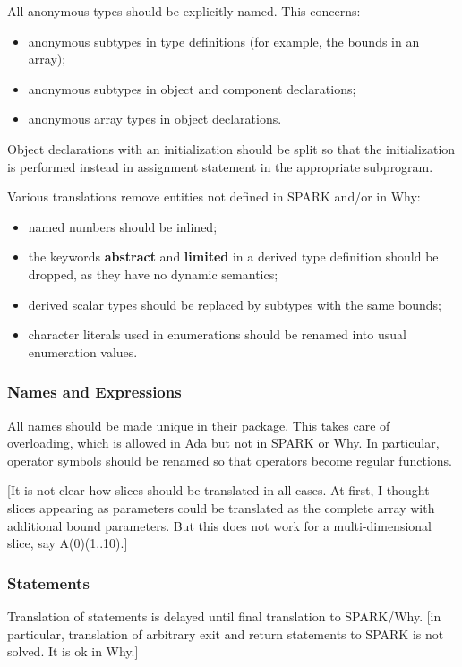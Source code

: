 \documentclass[fullpage]{article}
\newcounter{example}
\newcommand{\kw}[1]{\textbf{#1}}
\begin{document}
All anonymous types should be explicitly named. This concerns:
\begin{itemize}
\item anonymous subtypes in type definitions (for example, the bounds in an
  array);
\item anonymous subtypes in object and component declarations;
\item anonymous array types in object declarations.
\end{itemize}

Object declarations with an initialization should be split so that the
initialization is performed instead in assignment statement in the appropriate
subprogram.

Various translations remove entities not defined in SPARK and/or in Why:
\begin{itemize}
\item named numbers should be inlined;
\item the keywords \kw{abstract} and \kw{limited} in a derived type definition
  should be dropped, as they have no dynamic semantics;
\item derived scalar types should be replaced by subtypes with the same bounds;
\item character literals used in enumerations should be renamed into usual
  enumeration values.
\end{itemize}

\subsubsection{Names and Expressions}

All names should be made unique in their package. This takes care of
overloading, which is allowed in Ada but not in SPARK or Why. In particular,
operator symbols should be renamed so that operators become regular functions.

[It is not clear how slices should be translated in all cases. At first, I
thought slices appearing as parameters could be translated as the complete
array with additional bound parameters. But this does not work for a
multi-dimensional slice, say A(0)(1..10).]

\subsubsection{Statements}

Translation of statements is delayed until final translation to SPARK/Why. [in
particular, translation of arbitrary exit and return statements to SPARK is not
solved. It is ok in Why.]
\end{document}
